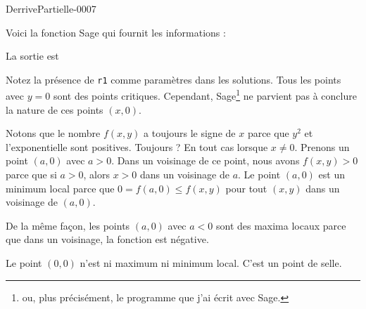 
\begin{corrige}{DerrivePartielle-0007}

	Voici la fonction Sage qui fournit les informations :

	

	La sortie est


	Notez la présence de \verb+r1+ comme paramètres dans les solutions. Tous les points avec $y=0$ sont des points critiques. Cependant, Sage\footnote{ou, plus précisément, le programme que j'ai écrit avec Sage.} ne parvient pas à conclure la nature de ces points $(x,0)$.

	Notons que le nombre $f(x,y)$ a toujours le signe de $x$ parce que $y^2$ et l'exponentielle sont positives. Toujours ? En tout cas lorsque $x\neq 0$. Prenons un point $(a,0)$ avec $a>0$. Dans un voisinage de ce point, nous avons $f(x,y)>0$ parce que si $a>0$, alors $x>0$ dans un voisinage de $a$. Le point $(a,0)$ est un minimum local parce que $0=f(a,0)\leq f(x,y)$ pour tout $(x,y)$ dans un voisinage de $(a,0)$.

	De la même façon, les points $(a,0)$ avec $a<0$ sont des maxima locaux parce que dans un voisinage, la fonction est négative. 

	Le point $(0,0)$ n'est ni maximum ni minimum local. C'est un point de selle.

\end{corrige}

